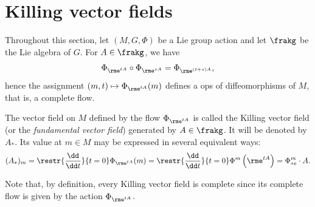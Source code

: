 \section{Killing vector fields}\label{sec Killing vectors}

Throughout this section, let $(M,G,\Phi)$ be a Lie group action and let $\frakg$ be the Lie algebra of $G$. For $A\in \frakg$, we have
\[\Phi_{\rme^{tA}}\circ\Phi_{\rme^{sA}}=\Phi_{\rme^{(t+s)A}},\]
hence the assignment $(m,t)\mapsto \Phi_{\rme^{tA}}(m)$ defines a \gls{ops} of diffeomorphisms of $M$, that is, a complete flow.

\begin{defn}
    The vector field on $M$ defined by the flow $\Phi_{\rme^{tA}}$ is called the Killing vector field (or the \emph{fundamental vector field}) generated by $A\in\frakg$. It will be denoted by $A_\ast$. Its value at $m\in M$ may be expressed in several equivalent ways:
    \[(A_\ast)_m=\restr{\frac{\dd}{\dd t}}{t=0}\Phi_{\rme^{tA}}(m)=\restr{\frac{\dd}{\dd t}}{t=0}\Phi^m\left(\rme^{tA}\right)=\Phi^m_{\ast e}\cdot A.\label{eq 6.2.1 RS1}\]
\end{defn}

Note that, by definition, every Killing vector field is complete since its complete flow is given by the action $\Phi_{\rme^{tA}}$. 

